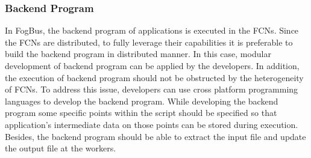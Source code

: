 \documentclass[final,5p,times,twocolumn]{elsarticle}
\begin{document}
\subsubsection{Backend Program}
In FogBus, the backend program of applications is executed in the FCNs. Since the FCNs are distributed, to fully leverage their capabilities it is preferable to build the backend program in distributed manner. In this case, modular development of backend program can be applied by the developers. In addition, the execution of backend program should not be obstructed by the heterogeneity of FCNs. To address this issue, developers can use cross platform programming languages to develop the backend program. While developing the backend program some specific points within the script should be specified so that application's intermediate data on those points can be stored during execution. Besides, the backend program should be able to extract the input file and update the output file at the workers.       
%
\end{document}
